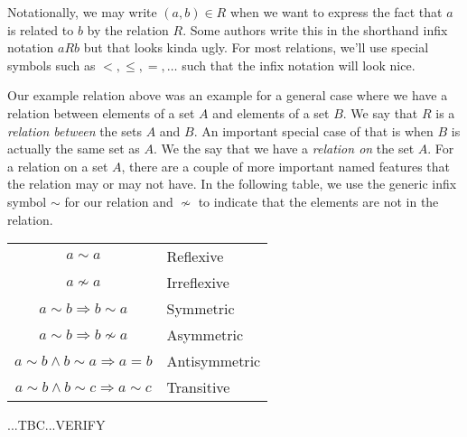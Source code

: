\medskip
Notationally, we may write $(a,b) \in R$ when we want to express the fact that $a$ is related to $b$ by the relation $R$. Some authors write this in the shorthand infix notation $a R b$ but that looks kinda ugly. For most relations, we'll use special symbols such as $<, \leq, =, \ldots$ such that the infix notation will look nice. 

\medskip
Our example relation above was an example for a general case where we have a relation between elements of a set $A$ and elements of a set $B$. We say that $R$ is a \emph{relation between} the sets $A$ and $B$. An important special case of that is when $B$ is actually the same set as $A$. We the say that we have a \emph{relation on} the set $A$. For a relation on a set $A$, there are a couple of more important named features that the relation may or may not have. In the following table, we use the generic infix symbol $\sim$ for our relation and $\nsim$ to indicate that the elements are not in the relation. 

\medskip
\begin{tabular}{c l}
  $a \sim a$                                       & Reflexive     \\
  $a \nsim a$                                      & Irreflexive   \\
  $a \sim b \Rightarrow b \sim a$                  & Symmetric     \\
  $a \sim b \Rightarrow b \nsim a$                 & Asymmetric    \\
  $a \sim b \wedge b \sim a \Rightarrow a = b $    & Antisymmetric \\
  $a \sim b \wedge b \sim c \Rightarrow a \sim c$  & Transitive    
\end{tabular}
\medskip
...TBC...VERIFY



